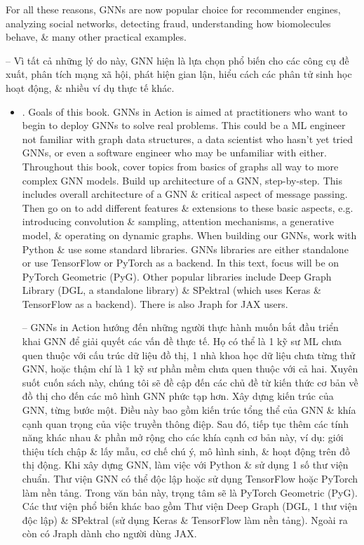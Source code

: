 \documentclass{article}
\begin{document}
\begin{itemize}
    For all these reasons, GNNs are now popular choice for recommender engines, analyzing social networks, detecting fraud, understanding how biomolecules behave, \& many other practical examples.

    -- Vì tất cả những lý do này, GNN hiện là lựa chọn phổ biến cho các công cụ đề xuất, phân tích mạng xã hội, phát hiện gian lận, hiểu cách các phân tử sinh học hoạt động, \& nhiều ví dụ thực tế khác.
    \begin{itemize}
        \item {. Goals of this book.} GNNs in Action is aimed at practitioners who want to begin to deploy GNNs to solve real problems. This could be a ML engineer not familiar with graph data structures, a data scientist who hasn't yet tried GNNs, or even a software engineer who may be unfamiliar with either. Throughout this book, cover topics from basics of graphs all way to more complex GNN models. Build up architecture of a GNN, step-by-step. This includes overall architecture of a GNN \& critical aspect of message passing. Then go on to add different features \& extensions to these basic aspects, e.g. introducing convolution \& sampling, attention mechanisms, a generative model, \& operating on dynamic graphs. When building our GNNs, work with Python \& use some standard libraries. GNNs libraries are either standalone or use TensorFlow or PyTorch as a backend. In this text, focus will be on PyTorch Geometric (PyG). Other popular libraries include Deep Graph Library (DGL, a standalone library) \& SPektral (which uses Keras \& TensorFlow as a backend). There is also Jraph for JAX users.

        -- GNNs in Action hướng đến những người thực hành muốn bắt đầu triển khai GNN để giải quyết các vấn đề thực tế. Họ có thể là 1 kỹ sư ML chưa quen thuộc với cấu trúc dữ liệu đồ thị, 1 nhà khoa học dữ liệu chưa từng thử GNN, hoặc thậm chí là 1 kỹ sư phần mềm chưa quen thuộc với cả hai. Xuyên suốt cuốn sách này, chúng tôi sẽ đề cập đến các chủ đề từ kiến thức cơ bản về đồ thị cho đến các mô hình GNN phức tạp hơn. Xây dựng kiến trúc của GNN, từng bước một. Điều này bao gồm kiến trúc tổng thể của GNN \& khía cạnh quan trọng của việc truyền thông điệp. Sau đó, tiếp tục thêm các tính năng khác nhau \& phần mở rộng cho các khía cạnh cơ bản này, ví dụ: giới thiệu tích chập \& lấy mẫu, cơ chế chú ý, mô hình sinh, \& hoạt động trên đồ thị động. Khi xây dựng GNN, làm việc với Python \& sử dụng 1 số thư viện chuẩn. Thư viện GNN có thể độc lập hoặc sử dụng TensorFlow hoặc PyTorch làm nền tảng. Trong văn bản này, trọng tâm sẽ là PyTorch Geometric (PyG). Các thư viện phổ biến khác bao gồm Thư viện Deep Graph (DGL, 1 thư viện độc lập) \& SPektral (sử dụng Keras \& TensorFlow làm nền tảng). Ngoài ra còn có Jraph dành cho người dùng JAX.


\end{itemize}
\end{itemize}
\end{document}
